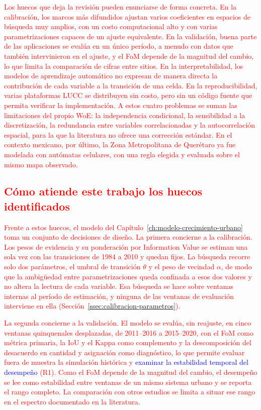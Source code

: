 \textcolor{red}{Los huecos que deja la revisión pueden enunciarse de forma
concreta. En la calibración, los marcos más difundidos ajustan varios
coeficientes en espacios de búsqueda muy amplios, con un costo computacional
alto y con varias parametrizaciones capaces de un ajuste equivalente. En la
validación, buena parte de las aplicaciones se evalúa en un único período, a
menudo con datos que también intervinieron en el ajuste, y el FoM depende de la
magnitud del cambio, lo que limita la comparación de cifras entre sitios. En la
interpretabilidad, los modelos de aprendizaje automático no expresan de manera
directa la contribución de cada variable a la transición de una celda. En la
reproducibilidad, varias plataformas LUCC se distribuyen sin costo, pero sin un
código fuente que permita verificar la implementación. A estos cuatro problemas
se suman las limitaciones del propio WoE: la independencia condicional, la
sensibilidad a la discretización, la redundancia entre variables
correlacionadas y la autocorrelación espacial, para la que la literatura no
ofrece una corrección estándar. En el contexto mexicano, por último, la Zona
Metropolitana de Querétaro ya fue modelada con autómatas celulares, con una
regla elegida y evaluada sobre el mismo mapa observado.}

\subsection{\textcolor{red}{Cómo atiende este trabajo los huecos identificados}}

\textcolor{red}{Frente a estos huecos, el modelo del
Capítulo~\ref{ch:modelo-crecimiento-urbano} toma un conjunto de decisiones de
diseño. La primera concierne a la calibración. Los pesos de evidencia y su
ponderación por Information Value se estiman una sola vez con las transiciones
de 1984 a 2010 y quedan fijos. La búsqueda recorre solo dos parámetros, el
umbral de transición $\theta$ y el peso de vecindad $\alpha$, de modo que la
ambigüedad entre parametrizaciones queda confinada a esos dos valores y no
altera la lectura de cada variable. Esa búsqueda se hace sobre ventanas
internas al período de estimación, y ninguna de las ventanas de evaluación
interviene en ella (Sección~\ref{ssec:calibracion-parametros}).}

\textcolor{red}{La segunda concierne a la validación. El modelo se evalúa, sin
reajuste, en cinco ventanas quinquenales desplazadas, de 2011--2016 a
2015--2020, con el FoM como métrica primaria, la IoU y el Kappa como
complemento y la descomposición del desacuerdo en cantidad y asignación como
diagnóstico, lo que permite evaluar fuera de muestra la simulación histórica y}
\textcolor{blue}{examinar la estabilidad temporal del desempeño}
\textcolor{red}{(R1). Como el FoM depende de la magnitud del cambio, el desempeño se lee como
estabilidad entre ventanas de un mismo sistema urbano y se reporta el rango
completo. La comparación con otros estudios se limita a situar ese rango en el
espectro documentado en la literatura.}

